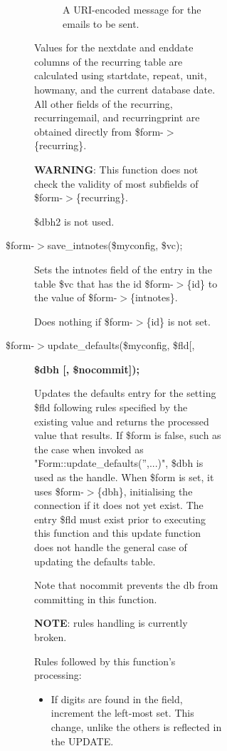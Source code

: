 \begin{description}
\begin{description}
\begin{description}
\begin{description}
\begin{description}
\begin{description}
\begin{description}
A URI-encoded message for the emails to be sent.

\end{description}


Values for the nextdate and enddate columns of the recurring table are
calculated using startdate, repeat, unit, howmany, and the current database
date.  All other fields of the recurring, recurringemail, and recurringprint are
obtained directly from \$form-$>$\{recurring\}.



\textbf{WARNING}: This function does not check the validity of most subfields of
\$form-$>$\{recurring\}.



\$dbh2 is not used.


\item[{\$form-$>$save\_intnotes(\$myconfig, \$vc);}] \mbox{}

Sets the intnotes field of the entry in the table \$vc that has the id
\$form-$>$\{id\} to the value of \$form-$>$\{intnotes\}.



Does nothing if \$form-$>$\{id\} is not set.


\item[{\$form-$>$update\_defaults(\$myconfig, \$fld[,}] \textbf{\$dbh [, \$nocommit]);}

Updates the defaults entry for the setting \$fld following rules specified by
the existing value and returns the processed value that results.  If \$form is
false, such as the case when invoked as "Form::update\_defaults('',...)", \$dbh is
used as the handle.  When \$form is set, it uses \$form-$>$\{dbh\}, initialising the
connection if it does not yet exist.  The entry \$fld must exist prior to
executing this function and this update function does not handle the general
case of updating the defaults table.



Note that nocommit prevents the db from committing in this function.



\textbf{NOTE}: rules handling is currently broken.



Rules followed by this function's processing:

\begin{itemize}

\item 

If digits are found in the field, increment the left-most set.  This change,
unlike the others is reflected in the UPDATE.



\end{itemize}
\end{description}
\end{description}
\end{description}
\end{description}
\end{description}
\end{description}
